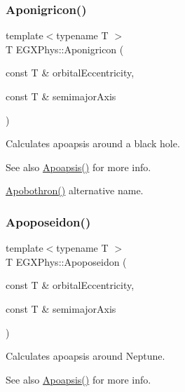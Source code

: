 \subsubsection{\texorpdfstring{Aponigricon()}{Aponigricon()}}
{\footnotesize\ttfamily template$<$typename T $>$ \\
T E\+G\+X\+Phys\+::\+Aponigricon (\begin{DoxyParamCaption}\item[{const T \&}]{orbital\+Eccentricity,  }\item[{const T \&}]{semimajor\+Axis }\end{DoxyParamCaption})}



Calculates apoapsis around a black hole. 

\begin{DoxySeeAlso}{See also}
\mbox{\hyperlink{group___e_g_x_phys-_apoapsis_gaf962e650bf84a568458e8eb39b1c61ba}{Apoapsis()}} for more info. 

\mbox{\hyperlink{group___e_g_x_phys-_apoapsis_ga6fe084b9e69f47a5032b05aa8f6bf7ad}{Apobothron()}} alternative name. 
\end{DoxySeeAlso}
\mbox{\label{group___e_g_x_phys-_apoapsis_ga89679654fff13176e989536163a27f9d}} 
\subsubsection{\texorpdfstring{Apoposeidon()}{Apoposeidon()}}
{\footnotesize\ttfamily template$<$typename T $>$ \\
T E\+G\+X\+Phys\+::\+Apoposeidon (\begin{DoxyParamCaption}\item[{const T \&}]{orbital\+Eccentricity,  }\item[{const T \&}]{semimajor\+Axis }\end{DoxyParamCaption})}



Calculates apoapsis around Neptune. 

\begin{DoxySeeAlso}{See also}
\mbox{\hyperlink{group___e_g_x_phys-_apoapsis_gaf962e650bf84a568458e8eb39b1c61ba}{Apoapsis()}} for more info. 
\end{DoxySeeAlso}
\mbox{\label{group___e_g_x_phys-_apoapsis_gac157adc20a88c8616e4822eb819f9016}} 
